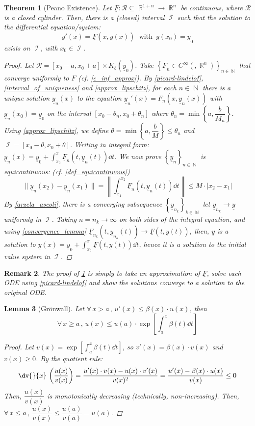 \documentclass[12pt]{article}
\newcommand{\Forall}[1]{\forall\,{#1}\,,\,}
\DeclareMathOperator{\R}{\mathbb{R}}
\DeclareMathOperator{\N}{\mathbb{N}}
\DeclareMathOperator{\I}{\mathcal{I}}
\newcommand{\seq}[2][n]{{\left\{#2\right\}}_{#1\in\N}}
\newcommand{\tuple}[1]{\underline{#1}}
\newtheorem{theorem}{Theorem}[subsection]
\newtheorem{lemma}[theorem]{Lemma}
\newtheorem{remark}[theorem]{Remark}
\begin{document}
\begin{theorem}[Peano Existence]
  \label{peano_existence}
  Let $\tuple{F}:\mathcal{R}\subseteq \R^{1+n}\to\R^n$ be continuous, where $\mathcal{R}$ is a closed cylinder. Then, there is a (closed) interval $\I$ such that the solution to the differential equation/system: $$\tuple{y}'(x)=\tuple{F}(x,\tuple{y}(x))\;\text{ with }\,\tuple{y}(x_0)=\tuple{y}_0$$ exists on $\I$, with $x_0\in\I$.
  \begin{proof}
    Let $\mathcal{R}=[x_0-a,x_0+a]\times K_b(\tuple{y}_0)$. Take $\seq{\tuple{F}_n\in C^\infty(,\R^n)}$ that converge uniformly to $F$ (cf. \ref{c_inf_approx}). By \ref{picard-lindelof}, \ref{interval_of_uniqueness} and \ref{approx_lipschitz}, for each $n\in\N$ there is a unique solution $\tuple{y}_n(x)$ to the equation $\tuple{y}_n'(x)=F_n(x,\tuple{y}_n(x))$ with $\tuple{y}_n(x_0)=\tuple{y}_0$ on the interval $[x_0-\theta_n,x_0+\theta_n]$ where $\theta_n=\min\left\{a,\dfrac{b}{M_n}\right\}$. Using \ref{approx_lipschitz}, we define $\theta=\min\left\{a,\dfrac{b}{M}\right\}\leq \theta_n$ and $\I=[x_0-\theta,x_0+\theta]$. Writing in integral form: $\displaystyle \tuple{y}_n(x)=\tuple{y}_0+\int_{x_0}^x \tuple{F}_n(t,\tuple{y}_n(t))\dd{t}$. We now prove $\seq{\tuple{y}_n}$ is equicontinuous: (cf. \ref{def_equicontinuous}) $$\|\tuple{y}_n(x_2)-\tuple{y}_n(x_1)\|=\left\|\int_{x_1}^{x_2} \tuple{F}_n(t,\tuple{y}_n(t))\dd{t}\right\|\leq M\cdot |x_2-x_1|$$ By \ref{arzela_ascoli}, there is a converging subsequence $\seq[k]{\tuple{y}_{n_k}}$ let $\tuple{y}_{n_k}\to \tuple{y}$ uniformly in $\I$. Taking $n=n_k\to\infty$ on both sides of the integral equation, and using \ref{convergence_lemma} $\tuple{F}_{n_k}(t,\tuple{y}_{n_k}(t))\to \tuple{F}(t,\tuple{y}(t))$, then, $\tuple{y}$ is a solution to $\displaystyle \tuple{y}(x)=\tuple{y}_0+\int_{x_0}^x \tuple{F}(t,\tuple{y}(t))\dd{t}$, hence it is a solution to the initial value system in $\I$.
  \end{proof}
\end{theorem}

\begin{remark}
  The proof of \ref{peano_existence} is simply to take an approximation of $\tuple{F}$, solve each ODE using \ref{picard-lindelof} and show the solutions converge to a solution to the original ODE.
\end{remark}

\begin{lemma}[Grönwall]
  \label{gronwall}
  Let $\Forall{x>a}u'(x)\leq \beta(x)\cdot u(x)$, then $$\Forall{x\geq a}u(x)\leq u(a)\cdot\exp\left[\int_a^x\beta(t)\dd{t}\right]$$
  \begin{proof}
    Let $\displaystyle v(x)=\exp\left[\int_a^x\beta(t)\dd{t}\right]$, so $v'(x)=\beta(x)\cdot v(x)$ and $v(x)\geq 0$. By the quotient rule: $$\dv{}{x}\,\left(\frac{u(x)}{v(x)}\right)=\frac{u'(x)\cdot v(x)-u(x)\cdot v'(x)}{v(x)^2}=\frac{u'(x)-\beta(x)\cdot u(x)}{v(x)}\leq 0$$ Then, $\dfrac{u(x)}{v(x)}$ is monotonically decreasing (technically, non-increasing). Then, $\Forall{x\leq a}\dfrac{u(x)}{v(x)}\leq\dfrac{u(a)}{v(a)}=u(a)$.
  \end{proof}
\end{lemma}
\end{document}
